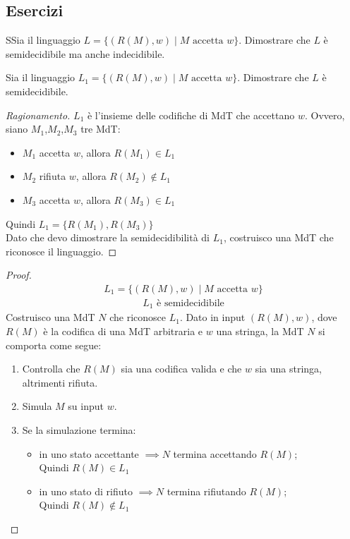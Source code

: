 \documentclass{article}  %
\theoremstyle{definition}
\newenvironment{ragionamento}[1][]
  {\begin{proof}[Ragionamento#1]\renewcommand{\qedsymbol}{}\normalfont}
  {\end{proof}}
\begin{document}
\subsection{Esercizi}
\begin{theorem}{}
  SSia il linguaggio $L = \{(R(M), w) \mid M \text{ accetta } w\}$. Dimostrare che $L$ è semidecidibile ma anche indecidibile.
\end{theorem}
\begin{esercizio}[Esercizio 2.1]
\footnotesize %
Sia il linguaggio $L_1 = \{(R(M), w) \mid M \text{ accetta } w\}$. Dimostrare che $L$ è semidecidibile.
\begin{ragionamento}
$L_1$ è l'insieme delle codifiche di MdT che accettano $w$. Ovvero, siano $M_1$,$M_2$,$M_3$ tre MdT:
\begin{itemize}
  \item $M_1$ accetta $w$, allora $R(M_1) \in L_1$
  \item $M_2$ rifiuta $w$, allora $R(M_2) \notin L_1$
  \item $M_3$ accetta $w$, allora $R(M_3) \in L_1$
\end{itemize}
Quindi \(L_1=\{R(M_1),R(M_3)\}\)  \\
Dato che devo dimostrare la semidecidibilità di $L_1$, costruisco una MdT che riconosce il linguaggio. 
\end{ragionamento}
\begin{proof}
\begin{align*}
  L_1 = \{(R(M), w) \mid M \text{ accetta } w\} \tag*{(ipotesi)}
\end{align*}
\begin{align*}
  L_1 \text{ è semidecidibile} \tag*{(tesi)}
\end{align*}
  Costruisco una MdT $N$ che riconosce $L_1$.
  Dato in input $(R(M),w)$, dove $R(M)$ è la codifica di una MdT arbitraria e $w$ una stringa, la MdT $N$ si comporta come segue:
  \begin{enumerate}
    \item Controlla che $R(M)$ sia una codifica valida e che $w$ sia una stringa, altrimenti rifiuta.
    \item Simula $M$ su input $w$.
    \item Se la simulazione termina:
    \begin{itemize}
      \item in uno stato accettante $\implies N$ termina accettando $R(M)$; \\ Quindi $R(M) \in L_1$
      \item in uno stato di rifiuto $\implies N$ termina rifiutando $R(M)$; \\ Quindi $R(M) \notin L_1$

\end{itemize}
\end{enumerate}
\end{proof}
\end{esercizio}
\end{document}
